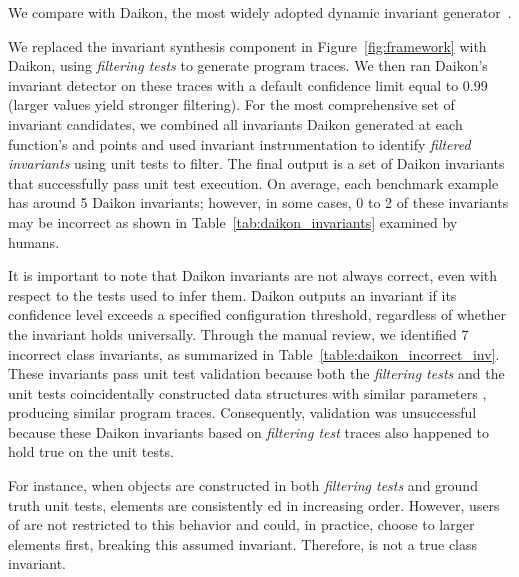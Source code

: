 We compare \tech with Daikon, the most widely adopted dynamic invariant generator~\cite{ernst2007daikon}. 

We replaced the invariant synthesis component in Figure~\ref{fig:framework} with Daikon, using \textit{filtering tests}  to generate program traces. We then ran Daikon’s invariant detector on these traces with a default confidence limit equal to 0.99 (larger values yield stronger filtering). For the most comprehensive set of invariant candidates, we combined all invariants Daikon generated at each function’s  and  points and used \tech invariant instrumentation to identify \textit{filtered invariants} using unit tests to filter. The final output is a set of Daikon invariants that successfully pass unit test execution. On average, each benchmark example has around 5 Daikon invariants; however, in some cases, 0 to 2 of these invariants may be incorrect as shown in Table~\ref{tab:daikon_invariants} examined by humans.

It is important to note that Daikon invariants are not always correct, even with respect to the tests used to infer them. Daikon outputs an invariant if its confidence level exceeds a specified configuration threshold, regardless of whether the invariant holds universally. Through the manual review, we identified 7 incorrect class invariants, as summarized in Table~\ref{table:daikon_incorrect_inv}. These invariants pass unit test validation because both the \textit{filtering tests} and the unit tests coincidentally constructed data structures with similar parameters , producing similar program traces. Consequently, validation was unsuccessful because these Daikon invariants based on \textit{filtering test} traces also happened to hold true on the unit tests.

For instance, when  objects are constructed in both \textit{filtering tests} and ground truth unit tests, elements are consistently ed in increasing order. However, users of  are not restricted to this behavior and could, in practice, choose to  larger elements first, breaking this assumed invariant. Therefore,  is not a true class invariant.


